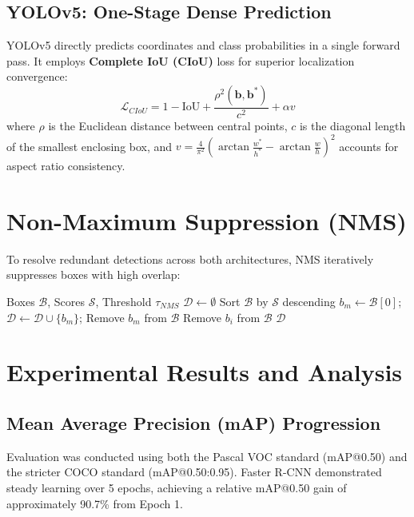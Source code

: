 \documentclass[conference]{IEEEtran}
\begin{document}
\subsection{YOLOv5: One-Stage Dense Prediction}
YOLOv5 directly predicts coordinates and class probabilities in a single forward pass. It employs \textbf{Complete IoU (CIoU)} loss for superior localization convergence:
\begin{equation}
    \mathcal{L}_{CIoU} = 1 - \text{IoU} + \frac{\rho^2(\mathbf{b}, \mathbf{b}^*)}{c^2} + \alpha v
\end{equation}
where $\rho$ is the Euclidean distance between central points, $c$ is the diagonal length of the smallest enclosing box, and $v = \frac{4}{\pi^2}(\arctan\frac{w^*}{h^*} - \arctan\frac{w}{h})^2$ accounts for aspect ratio consistency.

\section{Non-Maximum Suppression (NMS)}
To resolve redundant detections across both architectures, NMS iteratively suppresses boxes with high overlap:
\begin{algorithm}[H]
\caption{Non-Maximum Suppression (NMS)}
\begin{algorithmic}[1]
\REQUIRE Boxes $\mathcal{B}$, Scores $\mathcal{S}$, Threshold $\tau_{NMS}$
\STATE $\mathcal{D} \leftarrow \emptyset$
\STATE Sort $\mathcal{B}$ by $\mathcal{S}$ descending
    \STATE $b_{m} \leftarrow \mathcal{B}[0]$; $\mathcal{D} \leftarrow \mathcal{D} \cup \{b_m\}$; Remove $b_m$ from $\mathcal{B}$
            \STATE Remove $b_i$ from $\mathcal{B}$
        \ENDIF
    \ENDFOR
\ENDWHILE
\RETURN $\mathcal{D}$
\end{algorithmic}
\end{algorithm}

\section{Experimental Results and Analysis}

\subsection{Mean Average Precision (mAP) Progression}
Evaluation was conducted using both the Pascal VOC standard (mAP@0.50) and the stricter COCO standard (mAP@0.50:0.95). Faster R-CNN demonstrated steady learning over 5 epochs, achieving a relative mAP@0.50 gain of approximately 90.7\% from Epoch 1.
\end{document}
